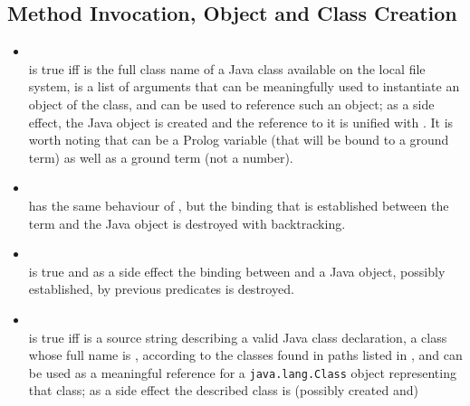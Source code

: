 \subsection{Method Invocation, Object and Class Creation}

\begin{itemize}
%
\item {}\\
\noindent{} is true iff
 is the full class name of a Java class available on
the local file system,  is a list of arguments that
can be meaningfully used to instantiate an object of the class,
and  can be used to reference such an object;
%
as a side effect, the Java object is created and the reference to
it is unified with .
%
It is worth noting that  can be a Prolog variable (that
will be bound to a ground term) as well as a ground term (not a
number).\\
%
\item {}\\
\noindent{} has the same behaviour of , but the binding that is established between the  term and the Java object is destroyed with backtracking.\\
%
\item {}\\
\noindent{} is true and as a side effect
the binding between  and a Java object,
possibly established, by previous predicates is destroyed.\\
%
\item {}\\
\noindent{}
is true iff  is a source string describing a
valid Java class declaration, a class whose full name is
, according to the classes found in paths
listed in , and  can be used as a
meaningful reference for a \texttt{java.lang.Class} object
representing that class;
%
as a side effect the described class is (possibly created and)

\end{itemize}
